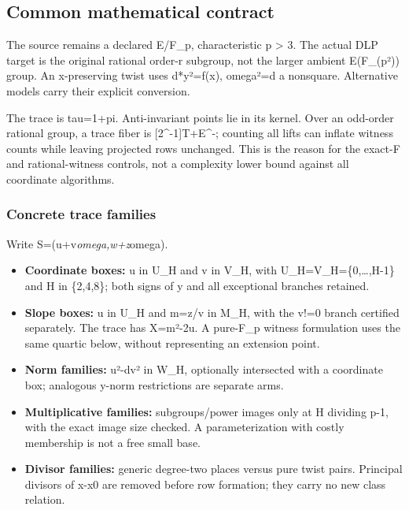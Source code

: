 \documentclass[
  10pt,
]{article}
\providecommand{\tightlist}{%
  \setlength{\itemsep}{0pt}\setlength{\parskip}{0pt}}
\begin{document}
\subsection{Common mathematical
contract}\label{common-mathematical-contract}

The source remains a declared E/F\_p, characteristic p \textgreater{} 3.
The actual DLP target is the original rational order-r subgroup, not the
larger ambient E(F\_(p²)) group. An x-preserving twist uses d*y²=f(x),
omega²=d a nonsquare. Alternative models carry their explicit
conversion.

The trace is tau=1+pi. Anti-invariant points lie in its kernel. Over an
odd-order rational group, a trace fiber is {[}2\^{}-1{]}T+E\^{}-;
counting all lifts can inflate witness counts while leaving projected
rows unchanged. This is the reason for the exact-F and rational-witness
controls, not a complexity lower bound against all coordinate
algorithms.

\subsubsection{Concrete trace families}\label{concrete-trace-families}

Write S=(u+v\emph{omega,w+z}omega).

\begin{itemize}
\tightlist
\item
  \textbf{Coordinate boxes:} u in U\_H and v in V\_H, with
  U\_H=V\_H=\{0,\ldots,H-1\} and H in \{2,4,8\}; both signs of y and all
  exceptional branches retained.
\item
  \textbf{Slope boxes:} u in U\_H and m=z/v in M\_H, with the v!=0
  branch certified separately. The trace has X=m²-2u. A pure-F\_p
  witness formulation uses the same quartic below, without representing
  an extension point.
\item
  \textbf{Norm families:} u²-dv² in W\_H, optionally intersected with a
  coordinate box; analogous y-norm restrictions are separate arms.
\item
  \textbf{Multiplicative families:} subgroups/power images only at H
  dividing p-1, with the exact image size checked. A parameterization
  with costly membership is not a free small base.
\item
  \textbf{Divisor families:} generic degree-two places versus pure twist
  pairs. Principal divisors of x-x0 are removed before row formation;
  they carry no new class relation.
\end{itemize}
\end{document}

